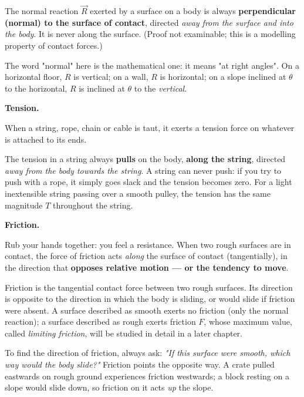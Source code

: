 \documentclass[11pt]{article}
\newcommand{\cle}[1]{{\popxbold\color{popdark}#1}}
\begin{document}
\begin{propriete}
The normal reaction $\vec{R}$ exerted by a surface on a body is always \textbf{perpendicular (normal) to the surface of contact}, directed \emph{away from the surface and into the body}. It is never along the surface. (Proof not examinable; this is a modelling property of contact forces.)
\end{propriete}

The word "normal" here is the mathematical one: it means "at right angles". On a horizontal floor, $R$ is vertical; on a wall, $R$ is horizontal; on a slope inclined at $\theta$ to the horizontal, $R$ is inclined at $\theta$ to the \emph{vertical}.

\textbf{Tension.}\par
When a string, rope, chain or cable is taut, it exerts a \cle{tension} force on whatever is attached to its ends.

\begin{attention}
The tension in a string always \textbf{pulls} on the body, \textbf{along the string}, directed \emph{away from the body towards the string}. A string can never push: if you try to push with a rope, it simply goes slack and the tension becomes zero. For a light inextensible string passing over a smooth pulley, the tension has the same magnitude $T$ throughout the string.
\end{attention}

\textbf{Friction.}\par
Rub your hands together: you feel a resistance. When two rough surfaces are in contact, the force of \cle{friction} acts \emph{along} the surface of contact (tangentially), in the direction that \textbf{opposes relative motion — or the tendency to move}.

\begin{definition}[Friction]
\cle{Friction} is the tangential contact force between two rough surfaces. Its direction is opposite to the direction in which the body is sliding, or would slide if friction were absent. A surface described as \cle{smooth} exerts no friction (only the normal reaction); a surface described as \cle{rough} exerts friction $F$, whose maximum value, called \emph{limiting friction}, will be studied in detail in a later chapter.
\end{definition}

To find the direction of friction, always ask: \emph{"If this surface were smooth, which way would the body slide?"} Friction points the opposite way. A crate pulled eastwards on rough ground experiences friction westwards; a block resting on a slope would slide down, so friction on it acts \emph{up} the slope.
\end{document}

